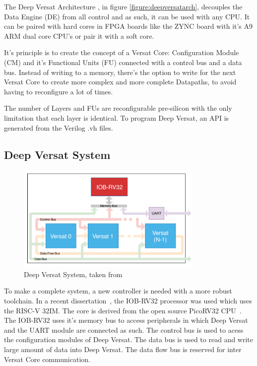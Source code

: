 The Deep Versat Architecture\cite{valter:deepversat}
, in figure \ref{figure:deepversatarch}, decouples the Data Engine (DE) from all control and as such, it can be used with any CPU. 
It can be paired with hard cores in
FPGA boards like the ZYNC board %
with it's A9 ARM dual core CPU's or pair it with a soft core.

It's principle is to create the concept of a Versat Core: Configuration Module (CM) and it's Functional Units (FU) connected with a control bus and a data bus.
Instead of writing to a memory, there's the option to write for the next
Versat Core to create more complex and more complete Datapaths, to avoid
having to reconfigure a lot of times.

The number of Layers and FUs are reconfigurable pre-silicon with the only limitation
that each layer is identical. To program Deep Versat, an API is generated
from the Verilog .vh files. 




\newpage
\subsection{Deep Versat System}

\begin{figure}[!htbp]
    \centering
    \includegraphics[width=0.8\textwidth]{Figures/deep-versat-top.png}
    \caption{Deep Versat System, taken from~\cite{valter:deepversat}}
    \label{figure:deepversattop}
\end{figure} 

To make a complete system, a new controller is needed with a more robust toolchain.
In a recent dissertation~\cite{valter:deepversat}, the IOB-RV32 processor was used which uses the RISC-V 32IM. The core is derived from
the open source PicoRV32 CPU~\cite{picorv}.
The IOB-RV32 uses it's memory bus to access peripherals in which Deep Versat and the UART module are connected as such.
The control bus is used to acess the configuration modules of Deep Versat. The data bus is used to read and write
large amount of data into Deep Versat. The data flow bus is reserved for inter Versat Core communication.

